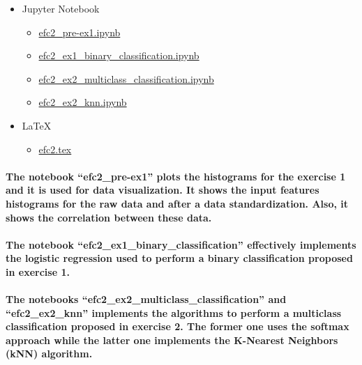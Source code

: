 \documentclass[a4paper]{article}    %
\begin{document}
\begin{itemize}
    \item Jupyter Notebook
    \begin{itemize}
        \item \href{https://github.com/ito-rafael/IA006C-MachineLearning/blob/master/efc2/efc2_pre-ex1.ipynb}{efc2\_pre-ex1.ipynb}
        \item \href{https://github.com/ito-rafael/IA006C-MachineLearning/blob/master/efc2/efc2_ex1_binary_classification.ipynb}{efc2\_ex1\_binary\_classification.ipynb}
        \item \href{https://github.com/ito-rafael/IA006C-MachineLearning/blob/master/efc2/efc2_ex2_multiclass_classification.ipynb}{efc2\_ex2\_multiclass\_classification.ipynb}
        \item \href{https://github.com/ito-rafael/IA006C-MachineLearning/blob/master/efc2/efc2_ex2_knn.ipynb}{efc2\_ex2\_knn.ipynb}
    \end{itemize}
    \item \LaTeX
    \begin{itemize}
        \item \href{https://github.com/ito-rafael/IA006C-MachineLearning/blob/master/efc2/LaTeX/efc2.tex}{efc2.tex}
    \end{itemize}
\end{itemize}

\paragraph{The notebook ``efc2\_pre-ex1'' plots the histograms for the exercise 1 and it is used for data visualization. It shows the input features histograms for the raw data and after a data standardization. Also, it shows the correlation between these data.}

\paragraph{The notebook ``efc2\_ex1\_binary\_classification'' effectively implements the logistic regression used to perform a binary classification proposed in exercise 1.}

\paragraph{The notebooks ``efc2\_ex2\_multiclass\_classification'' and ``efc2\_ex2\_knn'' implements the algorithms to perform a multiclass classification proposed in exercise 2. The former one uses the softmax approach while the latter one implements the K-Nearest Neighbors (kNN) algorithm.}
\end{document}
